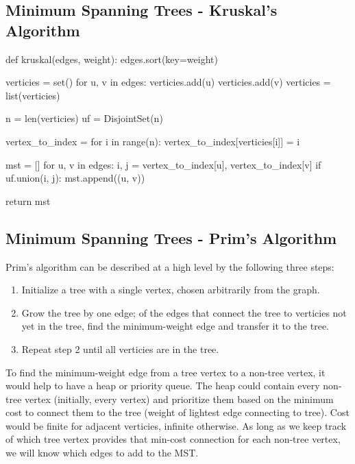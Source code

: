 \documentclass[12pt, titlepage]{article}
\begin{document}
\subsection{Minimum Spanning Trees - Kruskal's Algorithm}

\begin{python}
def kruskal(edges, weight):
    edges.sort(key=weight)

    verticies = set()
    for u, v in edges:
        verticies.add(u)
        verticies.add(v)
    verticies = list(verticies)

    n = len(verticies)
    uf = DisjointSet(n)

    vertex_to_index = {}
    for i in range(n):
        vertex_to_index[verticies[i]] = i

    mst = []
    for u, v in edges:
        i, j = vertex_to_index[u], vertex_to_index[v]
        if uf.union(i, j):
            mst.append((u, v))

    return mst
\end{python}

\subsection{Minimum Spanning Trees - Prim's Algorithm}
Prim's algorithm can be described at a high level by the following three steps:
\begin{enumerate}
  \item Initialize a tree with a single vertex, chosen arbitrarily from the graph.
  \item Grow the tree by one edge; of the edges that connect the tree to verticies not yet in the tree, find the minimum-weight edge and transfer it to the tree.
  \item Repeat step 2 until all verticies are in the tree.
\end{enumerate}

To find the minimum-weight edge from a tree vertex to a non-tree vertex, it would help to have a heap or priority queue. The heap could contain every non-tree vertex (initially, every vertex) and prioritize them based on the minimum cost to connect them to the tree (weight of lightest edge connecting to tree). Cost would be finite for adjacent verticies, infinite otherwise. As long as we keep track of which tree vertex provides that min-cost connection for each non-tree vertex, we will know which edges to add to the MST. \\
\end{document}
